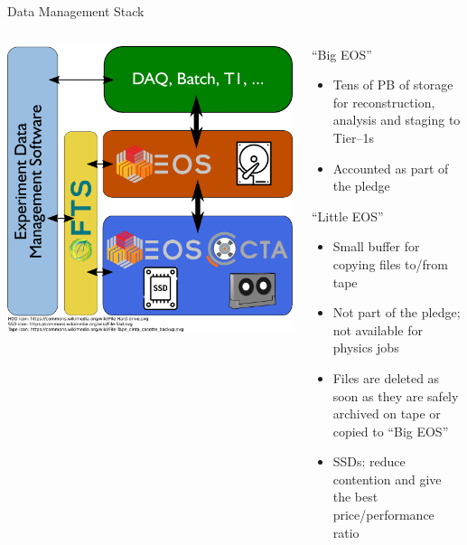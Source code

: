 \documentclass[aspectratio=1610]{beamer}
\begin{document}
\begin{frame}{Data Management Stack}
\begin{columns}
	\begin{column}{0.4\textwidth}
		\begin{center}
         \includegraphics[width=\textwidth]{images/CTA_Deployment}
		\end{center}
	\end{column}
	\begin{column}{0.55\textwidth}
      {\color{cern@blue}``Big EOS''}
      {\small
\begin{itemize}
        \item Tens of PB of storage for reconstruction, analysis and staging to Tier--1s
        \item Accounted as part of the pledge
\end{itemize}
      }
      {\color{cern@blue}``Little EOS''}
      {\small
		\begin{itemize}
        \item Small buffer for copying files to/from tape
        \item Not part of the pledge; not available for physics jobs
        \item Files are deleted as soon as they are safely archived on tape or
           copied to ``Big EOS''
        \item SSDs: reduce contention and give the best price/performance ratio
		\end{itemize}
      }
	\end{column}
\end{columns}
\end{frame}
\end{document}

